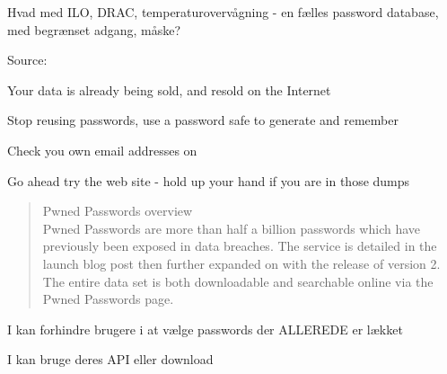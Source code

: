 \documentclass[Screen16to9,17pt]{foils}
\begin{document}
\vskip 1cm
Hvad med ILO, DRAC, temperaturovervågning - en fælles password database, med begrænset adgang, måske?




Source:




\begin{list1}
\item Your data is already being sold, and resold on the Internet
\item Stop reusing passwords, use a password safe to generate and remember
\item Check you own email addresses on 
\end{list1}

\centerline{Go ahead try the web site - hold up your hand if you are in those dumps}



\begin{quote}
Pwned Passwords overview\\
Pwned Passwords are more than half a billion passwords which have previously been exposed in data breaches. The service is detailed in the launch blog post then further expanded on with the release of version 2. The entire data set is both downloadable and searchable online via the Pwned Passwords page.
\end{quote}

\begin{list1}
\item I kan forhindre brugere i at vælge passwords der ALLEREDE er lækket
\item I kan bruge deres API eller download\\
{\footnotesize{}}
\end{list1}





\end{document}
